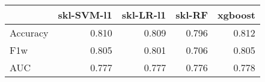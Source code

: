 \begin{tabular}{lrrrr}
\toprule
{} &  skl-SVM-l1 &  skl-LR-l1 &  skl-RF &  xgboost \\
\midrule
Accuracy &       0.810 &      0.809 &   0.796 &    0.812 \\
F1w      &       0.805 &      0.801 &   0.706 &    0.805 \\
AUC      &       0.777 &      0.777 &   0.776 &    0.778 \\
\bottomrule
\end{tabular}
